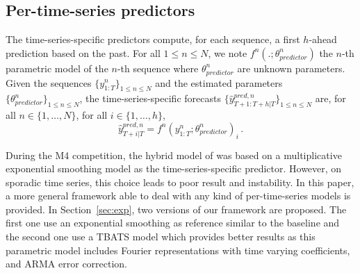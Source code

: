 \documentclass{article} %
\newcommand{\ts}{y}
\newcommand{\tspred}{\hat{\ts}}
\newcommand{\stat}{f}
\newcommand{\statparam}{\theta_{predictor}}
\newcommand{\lag}{h}
\begin{document}
\subsection{Per-time-series predictors}
The time-series-specific predictors compute, for each sequence, a first $\lag$-ahead prediction based on the past. For all $1\leqslant n \leqslant N$, we note $\stat^n(.;\statparam^n)$ the $n$-th parametric model of the $n$-th sequence where $\statparam^n$ are  unknown parameters. Given the sequences $\{\ts^n_{1:T}\}_{1\leqslant n \leqslant N}$ and the estimated  parameters $\{\statparam^n\}_{1\leqslant n \leqslant N}$, the time-series-specific forecasts $\{\tspred^{pred,n}_{T+1:T+\lag|T}\}_{1\leqslant n \leqslant N}$ are, for all $n \in \{1,\ldots,N\}$, for all $i \in \{1,\ldots,\lag\}$,
$$
\tspred^{pred,n}_{T+i|T} = \stat^n(\ts^n_{1:T};\statparam^n)_i\,.
$$

During the M4 competition, the hybrid model of \cite{smyl2020hybrid} was based on a multiplicative exponential smoothing model as the time-series-specific predictor. However, on sporadic time series, this choice leads to poor result and instability. In this paper, a more general framework able to deal with any kind of per-time-series models is provided. In Section~\ref{sec:exp}, two versions of our framework are proposed. The first one use an  exponential smoothing as reference similar to the baseline \cite{smyl2020hybrid} and the second one use a TBATS model \cite{doi:10.1198/jasa.2011.tm09771} which provides better results as this parametric model includes  Fourier representations with time varying coefficients, and ARMA error correction. %
\end{document}

